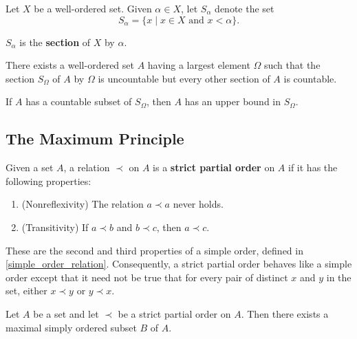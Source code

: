 \begin{definition}
Let $X$ be a well-ordered set. Given $\alpha \in X$, let $S_\alpha$ denote the set
\[
    S_\alpha = \{ x \mid x \in X \text{ and } x < \alpha\}.
\]

$S_\alpha$ is the \textbf{section} of $X$ by $\alpha$.
\end{definition}

\begin{lemma}
There exists a well-ordered set $A$ having a largest element $\Omega$ such that the section
$S_\Omega$ of $A$ by $\Omega$ is uncountable but every other section of $A$ is countable.   
\end{lemma}

\begin{theorem}
If $A$ has a countable subset of $S_\Omega$, then $A$ has an upper bound in $S_\Omega$.     
\end{theorem}

\subsection{The Maximum Principle}

\begin{definition}
Given a set $A$, a relation $\prec $ on $A$ is a \textbf{strict partial order} on $A$ if it has the following properties:
\begin{enumerate}
    \item (Nonreflexivity) The relation $a \prec a$ never holds.
    \item (Transitivity) If $a \prec b$ and $b \prec c$, then $a \prec c$.
\end{enumerate}

\end{definition}


\begin{remark}
    These are the second and third properties of a simple order, defined in \cref{simple_order_relation}. 
    Consequently, a strict partial order behaves like a simple order except that it need not be true that for
    every pair of distinct $x$ and $y$ in the set, either $x \prec y$ or $y \prec x$.
\end{remark}

\begin{theorem}
Let $A$ be a set and let $\prec$ be a strict partial order on $A$. Then there exists a maximal simply ordered subset $B$ of $A$.
\end{theorem}